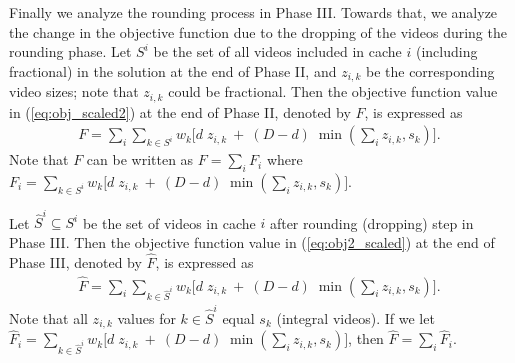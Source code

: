 \documentclass[conference]{IEEEtran}
\begin{document}
Finally we analyze the rounding process in Phase III. Towards that, we analyze the change in the objective function due to the dropping of the videos during the rounding phase. 
Let $S^i$ be the set of all videos included in cache $i$ (including fractional) in the solution at the end of Phase II, and $z_{i,k}$ be the corresponding video sizes; note that $z_{i,k}$ could be fractional.   
Then the objective function value in (\ref{eq:obj_scaled2}) at the end of Phase II, denoted by $F$, is expressed as
\begin{eqnarray}
F = \sum_i \sum_{k \in S^i} w_k \bigg[ d\; z_{i,k}  \ + \  (D-d)\; \min(\sum_i z_{i,k},s_k) \bigg]. \ 
\label{eq:f_defn}
\end{eqnarray}
Note that $F$ can be written as $F = \sum_i F_i$ where $F_i = \sum_{k \in S^i} w_k \bigg[ d\; z_{i,k}  \ + \  (D-d)\; \min(\sum_i z_{i,k},s_k) \bigg]$.

Let $\hat{S}^i \subseteq S^i$ be the set of videos in cache $i$ after rounding (dropping) step in Phase III. Then the objective function value in (\ref{eq:obj2_scaled}) at the end of Phase III, denoted by $\hat{F}$, is expressed as
\begin{eqnarray}
\hat{F} =  \sum_i \sum_{k \in \hat{S}^i} w_k \bigg[ d\; z_{i,k}  \ + \  (D-d)\; \min(\sum_i z_{i,k},s_k) \bigg]. \
\label{eq:fhat_defn}
\end{eqnarray}
Note that all $z_{i,k}$ values for $k \in \hat{S}^i$ equal $s_k$ (integral videos). If we let $\hat{F}_i = \sum_{k \in \hat{S}^i} w_k \bigg[ d\; z_{i,k}  \ + \  (D-d)\; \min(\sum_i z_{i,k},s_k) \bigg]$, then $\hat{F} = \sum_i \hat{F}_i$. 
\end{document}
